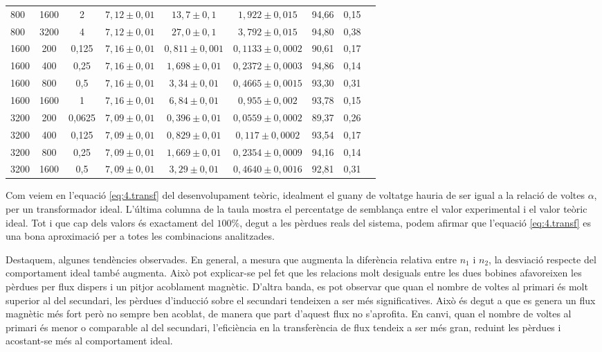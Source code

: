 \documentclass[a4paper,10.5pt]{report}
\begin{document}
\begin{table}[H]
\begin{tabular}{lcccccccc}
		800 & 1600 & 2 & $7{,}12 \pm 0{,}01$ & $13{,}7 \pm 0{,}1$ & $1{,}922 \pm 0{,}015$ & 94,66 & 0,15 \\
		800 & 3200 & 4 & $7{,}12 \pm 0{,}01$ & $27{,}0 \pm 0{,}1$ & $3{,}792 \pm 0{,}015$ & 94,80 & 0,38 \\
		\midrule
		1600 & 200 & 0{,}125 & $7{,}16 \pm 0{,}01$ & $0{,}811 \pm 0{,}001$ & $0{,}1133 \pm 0{,}0002$ & 90,61 & 0,17 \\
		1600 & 400 & 0{,}25 & $7{,}16 \pm 0{,}01$ & $1{,}698 \pm 0{,}01$ & $0{,}2372 \pm 0{,}0003$ & 94,86 & 0,14 \\
		1600 & 800 & 0{,}5 & $7{,}16 \pm 0{,}01$ & $3{,}34 \pm 0{,}01$ & $0{,}4665 \pm 0{,}0015$ & 93,30 & 0,31 \\
		1600 & 1600 & 1 & $7{,}16 \pm 0{,}01$ & $6{,}84 \pm 0{,}01$ & $0{,}955 \pm 0{,}002$ & 93,78 & 0,15 \\
		\midrule
		3200 & 200 & 0{,}0625 & $7{,}09 \pm 0{,}01$ & $0{,}396 \pm 0{,}01$ & $0{,}0559 \pm 0{,}0002$ & 89,37 & 0,26 \\
		3200 & 400 & 0{,}125 & $7{,}09 \pm 0{,}01$ & $0{,}829 \pm 0{,}01$ & $0{,}117 \pm 0{,}0002$ & 93,54 & 0,17 \\
		3200 & 800 & 0{,}25 & $7{,}09 \pm 0{,}01$ & $1{,}669 \pm 0{,}01$ & $0{,}2354 \pm 0{,}0009$ & 94,16 & 0,14 \\
		3200 & 1600 & 0{,}5 & $7{,}09 \pm 0{,}01$ & $3{,}29 \pm 0{,}01$ & $0{,}4640 \pm 0{,}0016$ & 92,81 & 0,31 \\
		\bottomrule
	\end{tabular}
	\label{tab:4.2}
\end{table}

Com veiem en l'equació \eqref{eq:4.transf} del desenvolupament teòric, idealment el guany de voltatge hauria de ser igual a la relació de voltes $\alpha$, per un transformador ideal. L'última columna de la taula mostra el percentatge de semblança entre el valor experimental i el valor teòric ideal. Tot i que cap dels valors és exactament del $100\%$, degut a les pèrdues reals del sistema, podem afirmar que l'equació \eqref{eq:4.transf} es una bona aproximació per a totes les combinacions analitzades. 

Destaquem,  algunes tendències observades. En general, a mesura que augmenta la diferència relativa entre $n_1$ i $n_2$, la desviació respecte del comportament ideal també augmenta. Això pot explicar-se pel fet que les relacions molt desiguals entre les dues bobines afavoreixen les pèrdues per flux dispers i un pitjor acoblament magnètic. D'altra banda, es pot observar que quan el nombre de voltes al primari és molt superior al del secundari, les pèrdues d'inducció sobre el secundari tendeixen a ser més significatives. Això és degut a que es genera un flux magnètic més fort però no sempre ben acoblat, de manera que part d’aquest flux no s’aprofita. En canvi, quan el nombre de voltes al primari és menor o comparable al del secundari, l’eficiència en la transferència de flux tendeix a ser més gran, reduint les pèrdues i acostant-se més al comportament ideal.
\end{document}
